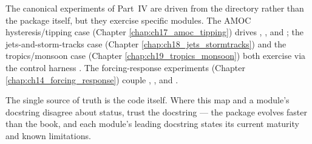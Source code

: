 The canonical experiments of Part~IV are driven from the  directory
rather than the package itself, but they exercise specific modules. The AMOC
hysteresis/tipping case (Chapter \ref{chap:ch17_amoc_tipping}) drives
, , and
; the jets-and-storm-tracks case (Chapter
\ref{chap:ch18_jets_stormtracks}) and the tropics/monsoon case (Chapter
\ref{chap:ch19_tropics_monsoon}) both exercise  via the
\dino{} control harness \citep{vallis2017}. The forcing-response experiments (Chapter
\ref{chap:ch14_forcing_response}) couple , , and
.

\begin{remark}
The single source of truth is the code itself. Where this map and a module's docstring
disagree about status, trust the docstring --- the package evolves faster than the book,
and each module's leading docstring states its current maturity and known limitations.
\end{remark}
